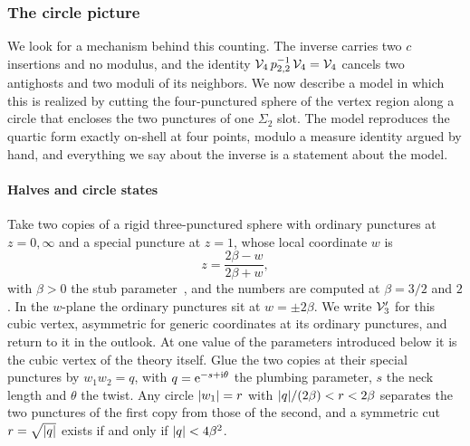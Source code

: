 \subsubsection{The circle picture}
\label{p:sec:ws:circle}

We look for a mechanism behind this counting.
The inverse carries two $c$ insertions and no modulus, and the identity $\mathcal{V}_{4} \, p_{2,2}^{-1} \, \mathcal{V}_{4} = \mathcal{V}_{4}$ cancels two antighosts and two moduli of its neighbors.
We now describe a model in which this is realized by cutting the four-punctured sphere of the vertex region along a circle that encloses the two punctures of one $\Sigma_2$ slot.
The model reproduces the quartic form exactly on-shell at four points, modulo a measure identity argued by hand, and everything we say about the inverse is a statement about the model.






\paragraph{Halves and circle states}
\label{p:sec:ws:halves}

Take two copies of a rigid three-punctured sphere with ordinary punctures at $z = 0, \infty$ and a special puncture at $z = 1$, whose local coordinate $w$ is
\begin{equation}
  \label{p:eq:ws:half}
  z
    = \frac{2 \beta - w}{2 \beta + w},
\end{equation}
with $\beta > 0$ the stub parameter~\cite{Erbin:2026:SL2CVerticesClosed}, and the numbers are computed at $\beta = 3 / 2$ and $2$.
In the $w$-plane the ordinary punctures sit at $w = \pm 2 \beta$.
We write $\mathcal{V}_{3}'$ for this cubic vertex, asymmetric for generic coordinates at its ordinary punctures, and return to it in the outlook.
At one value of the parameters introduced below it is the cubic vertex of the theory itself.
Glue the two copies at their special punctures by $w_1 w_2 = q$, with $q = \mathrm{e}^{- s + \mathrm{i} \theta}$ the plumbing parameter, $s$ the neck length and $\theta$ the twist.
Any circle ${|w_1|} = r$ with ${|q|} / (2 \beta) < r < 2 \beta$ separates the two punctures of the first copy from those of the second, and a symmetric cut $r = \sqrt{{|q|}}$ exists if and only if ${|q|} < 4 \beta^2$.

